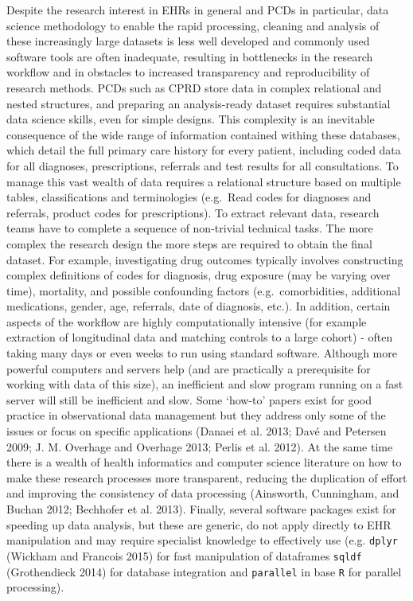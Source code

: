 \documentclass[]{article}
\begin{document}
Despite the research interest in EHRs in general and PCDs in particular,
data science methodology to enable the rapid processing, cleaning and
analysis of these increasingly large datasets is less well developed and
commonly used software tools are often inadequate, resulting in
bottlenecks in the research workflow and in obstacles to increased
transparency and reproducibility of research methods. PCDs such as CPRD
store data in complex relational and nested structures, and preparing an
analysis-ready dataset requires substantial data science skills, even
for simple designs. This complexity is an inevitable consequence of the
wide range of information contained withing these databases, which
detail the full primary care history for every patient, including coded
data for all diagnoses, prescriptions, referrals and test results for
all consultations. To manage this vast wealth of data requires a
relational structure based on multiple tables, classifications and
terminologies (e.g.~Read codes for diagnoses and referrals, product
codes for prescriptions). To extract relevant data, research teams have
to complete a sequence of non-trivial technical tasks. The more complex
the research design the more steps are required to obtain the final
dataset. For example, investigating drug outcomes typically involves
constructing complex definitions of codes for diagnosis, drug exposure
(may be varying over time), mortality, and possible confounding factors
(e.g.~comorbidities, additional medications, gender, age, referrals,
date of diagnosis, etc.). In addition, certain aspects of the workflow
are highly computationally intensive (for example extraction of
longitudinal data and matching controls to a large cohort) - often
taking many days or even weeks to run using standard software. Although
more powerful computers and servers help (and are practically a
prerequisite for working with data of this size), an inefficient and
slow program running on a fast server will still be inefficient and
slow. Some `how-to' papers exist for good practice in observational data
management but they address only some of the issues or focus on specific
applications (Danaei et al. 2013; Davé and Petersen 2009; J. M. Overhage
and Overhage 2013; Perlis et al. 2012). At the same time there is a
wealth of health informatics and computer science literature on how to
make these research processes more transparent, reducing the duplication
of effort and improving the consistency of data processing (Ainsworth,
Cunningham, and Buchan 2012; Bechhofer et al. 2013). Finally, several
software packages exist for speeding up data analysis, but these are
generic, do not apply directly to EHR manipulation and may require
specialist knowledge to effectively use (e.g. \texttt{dplyr} (Wickham
and Francois 2015) for fast manipulation of dataframes \texttt{sqldf}
(Grothendieck 2014) for database integration and \texttt{parallel} in
base \texttt{R} for parallel processing).
\end{document}
